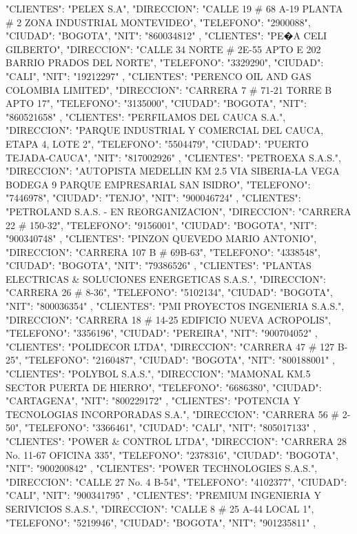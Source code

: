    {
   "CLIENTES": "PELEX S.A",
   "DIRECCION": "CALLE 19 # 68 A-19 PLANTA # 2 ZONA INDUSTRIAL MONTEVIDEO",
   "TELEFONO": "2900088",
   "CIUDAD": "BOGOTA",
   "NIT": "860034812"
   },
   {
   "CLIENTES": "PE�A CELI GILBERTO",
   "DIRECCION": "CALLE 34 NORTE # 2E-55 APTO E 202 BARRIO PRADOS DEL NORTE",
   "TELEFONO": "3329290",
   "CIUDAD": "CALI",
   "NIT": "19212297"
   },
   {
   "CLIENTES": "PERENCO OIL AND GAS COLOMBIA LIMITED",
   "DIRECCION": "CARRERA 7 # 71-21 TORRE B APTO 17",
   "TELEFONO": "3135000",
   "CIUDAD": "BOGOTA",
   "NIT": "860521658"
   },
   {
   "CLIENTES": "PERFILAMOS DEL CAUCA S.A.",
   "DIRECCION": "PARQUE INDUSTRIAL Y COMERCIAL DEL CAUCA, ETAPA 4, LOTE 2",
   "TELEFONO": "5504479",
   "CIUDAD": "PUERTO TEJADA-CAUCA",
   "NIT": "817002926"
   },
   {
   "CLIENTES": "PETROEXA S.A.S.",
   "DIRECCION": "AUTOPISTA MEDELLIN KM 2.5 VIA SIBERIA-LA VEGA BODEGA 9 PARQUE EMPRESARIAL SAN ISIDRO",
   "TELEFONO": "7446978",
   "CIUDAD": "TENJO",
   "NIT": "900046724"
   },
   {
   "CLIENTES": "PETROLAND S.A.S. - EN REORGANIZACION",
   "DIRECCION": "CARRERA 22 # 150-32",
   "TELEFONO": "9156001",
   "CIUDAD": "BOGOTA",
   "NIT": "900340748"
   },
   {
   "CLIENTES": "PINZON QUEVEDO MARIO ANTONIO",
   "DIRECCION": "CARRERA 107 B # 69B-63",
   "TELEFONO": "4338548",
   "CIUDAD": "BOGOTA",
   "NIT": "79386526"
   },
   {
   "CLIENTES": "PLANTAS ELECTRICAS & SOLUCIONES ENERGETICAS S.A.S.",
   "DIRECCION": "CARRERA 26 # 8-36",
   "TELEFONO": "5102134",
   "CIUDAD": "BOGOTA",
   "NIT": "800036354"
   },
   {
   "CLIENTES": "PMI PROYECTOS INGENIERIA S.A.S.",
   "DIRECCION": "CARRERA 18 # 14-25 EDIFICIO NUEVA ACROPOLIS",
   "TELEFONO": "3356196",
   "CIUDAD": "PEREIRA",
   "NIT": "900704052"
   },
   {
   "CLIENTES": "POLIDECOR LTDA",
   "DIRECCION": "CARRERA 47 # 127 B-25",
   "TELEFONO": "2160487",
   "CIUDAD": "BOGOTA",
   "NIT": "800188001"
   },
   {
   "CLIENTES": "POLYBOL S.A.S.",
   "DIRECCION": "MAMONAL KM.5 SECTOR PUERTA DE HIERRO",
   "TELEFONO": "6686380",
   "CIUDAD": "CARTAGENA",
   "NIT": "800229172"
   },
   {
   "CLIENTES": "POTENCIA Y TECNOLOGIAS INCORPORADAS S.A.",
   "DIRECCION": "CARRERA 56 # 2-50",
   "TELEFONO": "3366461",
   "CIUDAD": "CALI",
   "NIT": "805017133"
   },
   {
   "CLIENTES": "POWER & CONTROL LTDA",
   "DIRECCION": "CARRERA 28 No. 11-67 OFICINA 335",
   "TELEFONO": "2378316",
   "CIUDAD": "BOGOTA",
   "NIT": "900200842"
   },
   {
   "CLIENTES": "POWER TECHNOLOGIES S.A.S.",
   "DIRECCION": "CALLE 27 No. 4 B-54",
   "TELEFONO": "4102377",
   "CIUDAD": "CALI",
   "NIT": "900341795"
   },
   {
   "CLIENTES": "PREMIUM INGENIERIA Y SERIVICIOS S.A.S.",
   "DIRECCION": "CALLE 8 # 25 A-44 LOCAL 1",
   "TELEFONO": "5219946",
   "CIUDAD": "BOGOTA",
   "NIT": "901235811"
   },
